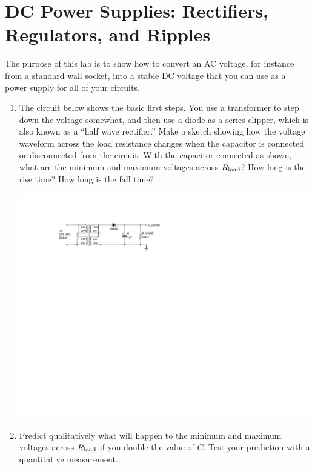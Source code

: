 \section{DC Power Supplies: Rectifiers, Regulators, and Ripples}
\label{lab_power_supply}


\bigskip

The purpose of this lab is to show how to convert an AC voltage, for instance from a standard wall socket, into a stable DC voltage that you can use as a power supply for all of your circuits.

\begin{enumerate}[wide]

\item The circuit below shows the basic first steps.  You use a transformer to step down the voltage somewhat, and then use a diode as a series clipper, which is also known as a ``half wave rectifier.''  Make a sketch showing how the voltage waveform across the load resistance  changes when the capacitor is connected or disconnected from the circuit.  With the capacitor connected as shown, what are the minimum and maximum voltages across $R_{\rm load}$?  How long is the rise time?  How long is the fall time?
\begin{center}
\includegraphics{power_supply/half_wave_rectifier.pdf}
\end{center}

\item Predict qualitatively what will happen to the minimum and maximum voltages across $R_{\rm load}$ if you double the value of $C$.  Test your prediction with a quantitative measurement.  


\end{enumerate}
